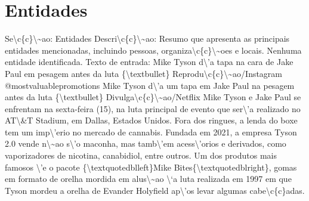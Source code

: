 \documentclass{article}%
\begin{document}
\section{Entidades}%
\label{sec:Entidades}%
Se\textbackslash{}c\{c\}\textbackslash{}\textasciitilde{}ao: Entidades\newline%
Descri\textbackslash{}c\{c\}\textbackslash{}\textasciitilde{}ao: Resumo que apresenta as principais entidades mencionadas, incluindo pessoas, organiza\textbackslash{}c\{c\}\textbackslash{}\textasciitilde{}oes e locais.\newline%
\newline%
Nenhuma entidade identificada.\newline%
\newline%
Texto de entrada:\newline%
Mike Tyson d\textbackslash{}'a tapa na cara de Jake Paul em pesagem antes da luta\newline%
\{\textbackslash{}textbullet\} Reprodu\textbackslash{}c\{c\}\textbackslash{}\textasciitilde{}ao/Instagram @mostvaluablepromotions\newline%
\newline%
Mike Tyson d\textbackslash{}'a um tapa em Jake Paul na pesagem antes da luta\newline%
\{\textbackslash{}textbullet\} Divulga\textbackslash{}c\{c\}\textbackslash{}\textasciitilde{}ao/Netflix\newline%
\newline%
Mike Tyson e Jake Paul se enfrentam na sexta{-}feira (15), na luta principal de evento que ser\textbackslash{}'a realizado no AT\textbackslash{}\&T Stadium, em Dallas, Estados Unidos. Fora dos ringues, a lenda do boxe tem um imp\textbackslash{}'erio no mercado de cannabis.\newline%
\newline%
Fundada em 2021, a empresa Tyson 2.0 vende n\textbackslash{}\textasciitilde{}ao s\textbackslash{}'o maconha, mas tamb\textbackslash{}'em acess\textbackslash{}'orios e derivados, como vaporizadores de nicotina, canabidiol, entre outros. Um dos produtos mais famosos \textbackslash{}'e o pacote \{\textbackslash{}textquotedblleft\}Mike Bites\{\textbackslash{}textquotedblright\}, gomas em formato de orelha mordida em alus\textbackslash{}\textasciitilde{}ao \textbackslash{}`a luta realizada em 1997 em que Tyson mordeu a orelha de Evander Holyfield ap\textbackslash{}'os levar algumas cabe\textbackslash{}c\{c\}adas.\newline%
\newline%
\end{document}
